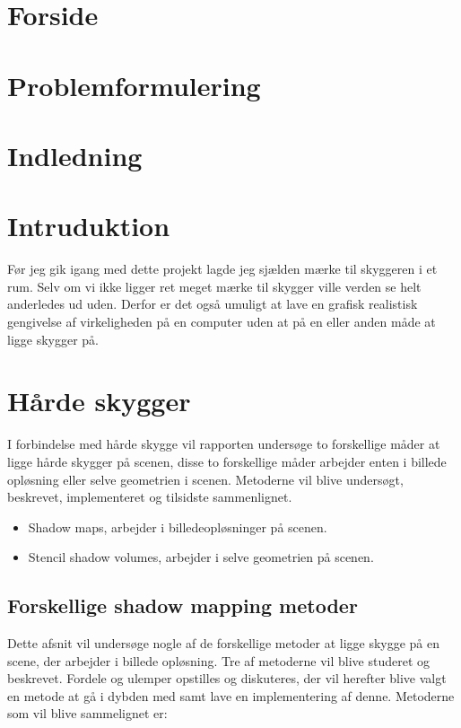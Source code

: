 \documentclass[11pt,a4paper]{article}
\begin{document}
\section{Forside}

\section{Problemformulering}


\section{Indledning}


\section{Intruduktion}
Før jeg gik igang med dette projekt lagde jeg sjælden mærke til skyggeren i et rum. Selv om vi ikke ligger ret meget mærke til skygger ville verden se helt anderledes ud uden. Derfor er det også umuligt at lave en grafisk realistisk gengivelse af virkeligheden på en computer uden at på en eller anden måde at ligge skygger på.

\section{Hårde skygger}

I forbindelse med hårde skygge vil rapporten undersøge to forskellige måder at ligge hårde skygger på scenen, disse to forskellige måder arbejder enten i billede opløsning eller selve geometrien i scenen. Metoderne vil blive undersøgt, beskrevet, implementeret og tilsidste sammenlignet.

\begin{itemize}
  \item Shadow maps, arbejder i billedeopløsninger på scenen.
  \item Stencil shadow volumes, arbejder i selve geometrien på scenen.
\end{itemize}

\subsection{Forskellige shadow mapping metoder}

Dette afsnit vil undersøge nogle af de forskellige metoder at ligge skygge på en scene, der arbejder i billede opløsning. Tre af metoderne vil blive studeret og beskrevet. Fordele og ulemper opstilles og diskuteres, der vil herefter blive valgt en metode at gå i dybden med samt lave en implementering af denne. Metoderne som vil blive sammelignet er:
\end{document}
